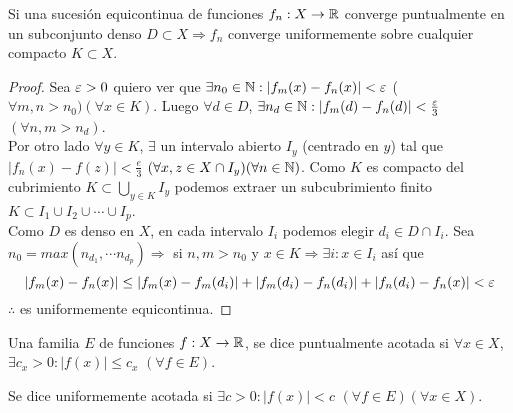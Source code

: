 \begin{theorem}
  Si una sucesión equicontinua de funciones $f_n: X \to \mathbb{R}$ converge puntualmente en un subconjunto denso $D \subset X \Rightarrow f_n$ converge uniformemente sobre cualquier compacto $K \subset X$.

  \begin{proof}
    Sea $\varepsilon > 0$ quiero ver que $\exists n_0 \in \mathbb{N} : |f_m(x) - f_n(x)| < \varepsilon$ ($\forall m, n > n_0)(\forall x \in K)$. Luego $\forall d \in D$, $\exists n_d \in \mathbb{N} : |f_m(d) - f_n(d)| < \frac{\varepsilon}{3}$ $(\forall n, m > n_d)$. \\
    Por otro lado $\forall y \in K$, $\exists$ un intervalo abierto $I_y$ (centrado en $y$) tal que $|f_n(x) - f(z)| < \frac{e}{3}$ $(\forall x, z \in X \cap I_y)(\forall n \in \mathbb{N})$. Como $K$ es compacto del cubrimiento $K \subset \bigcup_{y \in K} I_y$ podemos extraer un subcubrimiento finito $K \subset I_1 \cup I_2 \cup \cdots \cup I_p$. \\
    Como $D$ es denso en $X$, en cada intervalo $I_i$ podemos elegir $d_i \in D \cap I_i$. Sea $n_0 = max(n_{d_1}, \cdots n_{d_p}) \Rightarrow$ si $n, m > n_0$ y $x \in K \Rightarrow \exists i : x \in I_i$ así que \begin{equation}
      |f_m(x) - f_n(x)| \leq |f_m(x) - f_m(d_i)| + |f_m(d_i) - f_n(d_i)| + |f_n(d_i) - f_n(x)| < \varepsilon
    \end{equation} $\therefore$ es uniformemente equicontinua.
  \end{proof}
\end{theorem}

\begin{definition}
  Una familia $E$ de funciones $f: X \to \mathbb{R}$, se dice puntualmente acotada si $\forall x \in X$, $\exists c_x > 0 : |f(x)| \leq c_x$ $(\forall f \in E)$.
\end{definition}

\begin{definition}
  Se dice uniformemente acotada si $\exists c > 0 : |f(x)| < c$ $(\forall f \in E)(\forall x \in X)$.
\end{definition}

\clearpage

